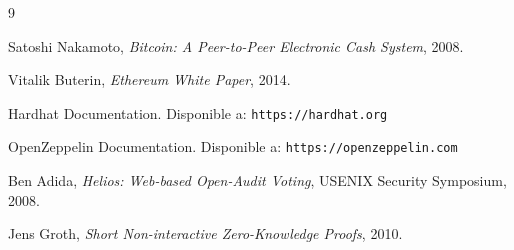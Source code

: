 \documentclass[12pt,a4paper]{article}
\begin{document}
\begin{thebibliography}{9}

Satoshi Nakamoto,
\textit{Bitcoin: A Peer-to-Peer Electronic Cash System},
2008.

Vitalik Buterin,
\textit{Ethereum White Paper},
2014.

Hardhat Documentation.  
Disponible a: \texttt{https://hardhat.org}

OpenZeppelin Documentation.  
Disponible a: \texttt{https://openzeppelin.com}

Ben Adida,
\textit{Helios: Web-based Open-Audit Voting},
USENIX Security Symposium, 2008.

Jens Groth,
\textit{Short Non-interactive Zero-Knowledge Proofs},
2010.

\end{thebibliography}
\end{document}

